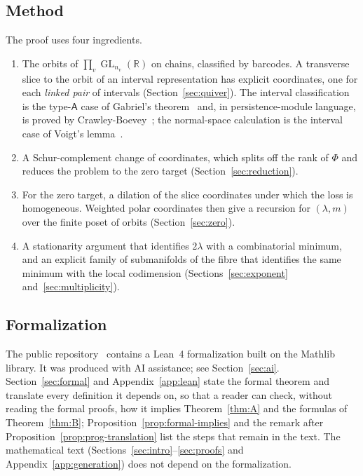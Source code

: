 \documentclass[11pt,a4paper]{article}
\theoremstyle{definition}
\theoremstyle{remark}
\numberwithin{equation}{section}
\newcommand{\R}{\mathbb{R}}
\newcommand{\GL}{\operatorname{GL}}
\begin{document}
\subsection{Method}
The proof uses four ingredients.
\begin{enumerate}[label=(\roman*)]
\item The orbits of $\prod_v\GL_{n_v}(\R)$ on chains, classified by barcodes. A transverse slice to the orbit of an interval representation has explicit coordinates, one for each \emph{linked pair} of intervals (Section~\ref{sec:quiver}). The interval classification is the type-$\mathsf A$ case of Gabriel's theorem~\cite{gabriel} and, in persistence-module language, is proved by Crawley-Boevey~\cite{crawley-boevey}; the normal-space calculation is the interval case of Voigt's lemma~\cite{voigt}.
\item A Schur-complement change of coordinates, which splits off the rank of $\Phi$ and reduces the problem to the zero target (Section~\ref{sec:reduction}).
\item For the zero target, a dilation of the slice coordinates under which the loss is homogeneous. Weighted polar coordinates then give a recursion for $(\lambda,m)$ over the finite poset of orbits (Section~\ref{sec:zero}).
\item A stationarity argument that identifies $2\lambda$ with a combinatorial minimum, and an explicit family of submanifolds of the fibre that identifies the same minimum with the local codimension (Sections~\ref{sec:exponent} and~\ref{sec:multiplicity}).
\end{enumerate}

\subsection{Formalization}
The public repository~\cite{feld-deep} contains a Lean~4 formalization built on the Mathlib library. It was produced with AI assistance; see Section~\ref{sec:ai}. Section~\ref{sec:formal} and Appendix~\ref{app:lean} state the formal theorem and translate every definition it depends on, so that a reader can check, without reading the formal proofs, how it implies Theorem~\ref{thm:A} and the formulas of Theorem~\ref{thm:B}; Proposition~\ref{prop:formal-implies} and the remark after Proposition~\ref{prop:prog-translation} list the steps that remain in the text. The mathematical text (Sections~\ref{sec:intro}--\ref{sec:proofs} and Appendix~\ref{app:generation}) does not depend on the formalization.
\end{document}
